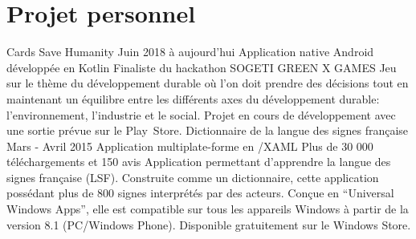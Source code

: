 \documentclass[]{friggeri-cv-custom} %
\begin{document}
\section{Projet personnel}
\begin{entrylist}
\entry
{Cards Save Humanity}
{Juin 2018 à aujourd'hui}
{Application native Android développée en Kotlin}
{Finaliste du hackathon SOGETI GREEN X GAMES}
{
  Jeu sur le thème du développement durable où l'on doit prendre des décisions
  tout en maintenant un équilibre entre les différents axes du développement
  durable: l'environnement, l'industrie et le social. Projet en cours de
  développement avec une sortie prévue sur le Play~Store.%
}
\entry
{Dictionnaire de la langue des signes française}
{Mars - Avril 2015}
{Application multiplate-forme en \Csharp /XAML}
{Plus de 30 000 téléchargements et 150 avis}
{
  Application permettant d'apprendre la langue des signes française (LSF).
  Construite comme un dictionnaire, cette application possédant plus de 800
  signes interprétés par des acteurs.
  Conçue en ``Universal Windows Apps'', elle est compatible sur tous les appareils
  Windows à partir de la version 8.1 (PC/Windows Phone). Disponible
  gratuitement sur le Windows Store.%
}%
\end{entrylist}%
%
\end{document}
